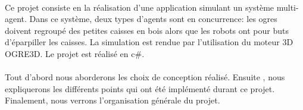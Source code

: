 \paragraph{}Ce projet consiste en la réalisation d'une application simulant un système
multi-agent. Dans ce système, deux types d'agents sont en concurrence: les
ogres doivent regroupé des petites caisses en bois alors que les robots ont
pour buts d'éparpiller les caisses.
La simulation est rendue par l'utilisation du moteur 3D OGRE3D. Le projet est
réalisé en c\#.


\paragraph{}Tout d'abord nous aborderons les choix de conception réalisé.
Ensuite , nous expliquerons les différents points qui ont été implémenté
durant ce projet. Finalement, nous verrons l'organisation générale du projet.


